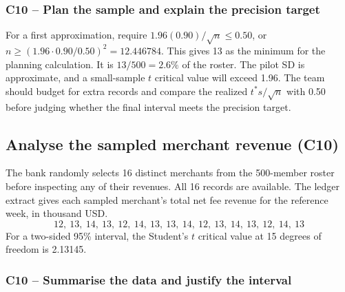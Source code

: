 
	\label{sol:c10-1-b}
	\subsubsection*{C10 -- Plan the sample and explain the precision target}

	For a first approximation, require $1.96(0.90)/\sqrt n\le 0.50$, or $n\ge (1.96\cdot0.90/0.50)^2=12.446784$. This gives 13 as the minimum for the planning calculation. It is $13/500=2.6\%$ of the roster. The pilot SD is approximate, and a small-sample $t$ critical value will exceed 1.96. The team should budget for extra records and compare the realized $t^*s/\sqrt n$ with 0.50 before judging whether the final interval meets the precision target.


	\clearpage

	\subsection{Analyse the sampled merchant revenue (C10)}
	\label{prob:c10-2}

	The bank randomly selects 16 distinct merchants from the 500-member roster before inspecting any of their revenues. All 16 records are available. The ledger extract gives each sampled merchant's total net fee revenue for the reference week, in thousand USD.
	\[
	12,\ 13,\ 14,\ 13,\ 12,\ 14,\ 13,\ 13,\ 14,\ 12,\ 13,\ 14,\ 13,\ 12,\ 14,\ 13
	\]
	For a two-sided 95\% interval, the Student's $t$ critical value at 15 degrees of freedom is 2.13145.


	\label{sol:c10-2-a}
	\subsubsection*{C10 -- Summarise the data and justify the interval}

